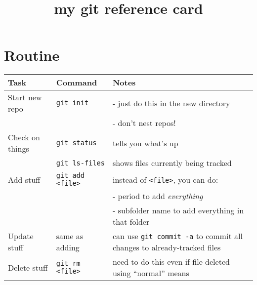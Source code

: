 \documentclass[]{article}
\title{my git reference card}
\author{}
\date{}
\begin{document}
\maketitle

\thispagestyle{empty}
\pagestyle{empty}

\section*{Routine}
\label{sec-1}


\begin{center}
\begin{tabular}{llp{2.5in}}
 Task                 &  Command                                         &  Notes                                                                          \\
\hline
 Start new repo       &  \texttt{git init}                               &  - just do this in the new directory                                            \\
                      &                                                  &  - don't nest repos!                                                            \\
 Check on things      &  \texttt{git status}                             &  tells you what's up                                                            \\
                      &  \texttt{git ls-files}                           &  shows files currently being tracked                                            \\
 Add stuff            &  \texttt{git add <file>}                         &  instead of \texttt{<file>}, you can do:                                        \\
                      &                                                  &  - period to add \emph{everything}                                              \\
                      &                                                  &  - subfolder name to add everything in that folder                              \\
 Update stuff         &  same as adding                                  &  can use \texttt{git commit -a} to commit all changes to already-tracked files  \\
 Delete stuff         &  \texttt{git rm <file>}                          &  need to do this even if file deleted using ``normal'' means                    \\

\end{tabular}
\end{center}
\end{document}
